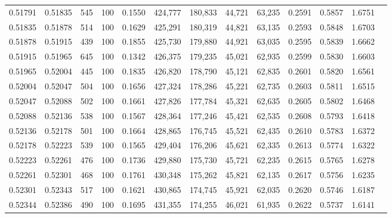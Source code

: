 \begin{tabular}{rrrrrrrrrrrrr}
0.51791 & 0.51835 &   545 & 100 &                                     0.1550 & 424,777 & 180,833 &  44,721 &  63,235 & 0.2591 & 0.5857 & 1.6751 \\
0.51835 & 0.51878 &   514 & 100 &                                     0.1629 & 425,291 & 180,319 &  44,821 &  63,135 & 0.2593 & 0.5848 & 1.6703 \\
0.51878 & 0.51915 &   439 & 100 &                                     0.1855 & 425,730 & 179,880 &  44,921 &  63,035 & 0.2595 & 0.5839 & 1.6662 \\
0.51915 & 0.51965 &   645 & 100 &                                     0.1342 & 426,375 & 179,235 &  45,021 &  62,935 & 0.2599 & 0.5830 & 1.6603 \\
0.51965 & 0.52004 &   445 & 100 &                                     0.1835 & 426,820 & 178,790 &  45,121 &  62,835 & 0.2601 & 0.5820 & 1.6561 \\
0.52004 & 0.52047 &   504 & 100 &                                     0.1656 & 427,324 & 178,286 &  45,221 &  62,735 & 0.2603 & 0.5811 & 1.6515 \\
0.52047 & 0.52088 &   502 & 100 &                                     0.1661 & 427,826 & 177,784 &  45,321 &  62,635 & 0.2605 & 0.5802 & 1.6468 \\
0.52088 & 0.52136 &   538 & 100 &                                     0.1567 & 428,364 & 177,246 &  45,421 &  62,535 & 0.2608 & 0.5793 & 1.6418 \\
0.52136 & 0.52178 &   501 & 100 &                                     0.1664 & 428,865 & 176,745 &  45,521 &  62,435 & 0.2610 & 0.5783 & 1.6372 \\
0.52178 & 0.52223 &   539 & 100 &                                     0.1565 & 429,404 & 176,206 &  45,621 &  62,335 & 0.2613 & 0.5774 & 1.6322 \\
0.52223 & 0.52261 &   476 & 100 &                                     0.1736 & 429,880 & 175,730 &  45,721 &  62,235 & 0.2615 & 0.5765 & 1.6278 \\
0.52261 & 0.52301 &   468 & 100 &                                     0.1761 & 430,348 & 175,262 &  45,821 &  62,135 & 0.2617 & 0.5756 & 1.6235 \\
0.52301 & 0.52343 &   517 & 100 &                                     0.1621 & 430,865 & 174,745 &  45,921 &  62,035 & 0.2620 & 0.5746 & 1.6187 \\
0.52344 & 0.52386 &   490 & 100 &                                     0.1695 & 431,355 & 174,255 &  46,021 &  61,935 & 0.2622 & 0.5737 & 1.6141 \\

\end{tabular}
